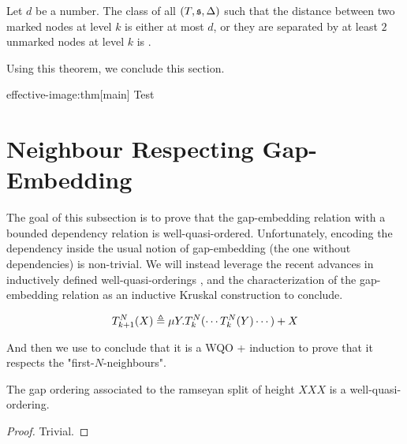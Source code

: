 \begin{theorem}
    Let $d$ be a number. The class of all $(T, \mathfrak{s}, \Delta)$
    such that the distance between two marked nodes at level $k$
    is either at most $d$, or they are separated by at least $2$ unmarked nodes
    at level $k$ is .
\end{theorem}

Using this theorem, we conclude this section.

\begin{proofof}{effective-image:thm}[main]
    Test
\end{proofof}


\section{Neighbour Respecting Gap-Embedding}
\label{sec:neighbour-respecting-gap-embedding}

The goal of this subsection is to prove that the gap-embedding relation with a
bounded dependency relation is well-quasi-ordered. Unfortunately, encoding the
dependency inside the usual notion of gap-embedding (the one without
dependencies) is non-trivial. We will instead leverage the recent advances in
inductively defined well-quasi-orderings \cite{FREU20,LOPEZ23}, and the
characterization of the gap-embedding relation as an inductive Kruskal
construction \cite{FREU20} to conclude.

\begin{equation*}
    T_{k+1}^N (X) \triangleq
    \mu Y. T_{k}^N( \cdots T_k^N(Y) \cdots ) + X
\end{equation*}

And then we use \cite{LOPEZ23} to conclude that it is a WQO + induction 
to prove that it respects the "first-$N$-neighbours".
\begin{theorem}
    \label{good-generalized-gap:thm}
    The gap ordering associated to the ramseyan split of height $XXX$ is a well-quasi-ordering.
\end{theorem}
\begin{proof}
    Trivial. 
\end{proof}


